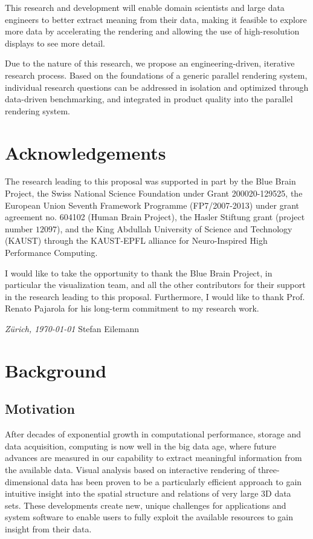 This research and development will enable domain scientists and large data
engineers to better extract meaning from their data, making it feasible to
explore more data by accelerating the rendering and allowing the use of
high-resolution displays to see more detail.

Due to the nature of this research, we propose an engineering-driven, iterative
research process. Based on the foundations of a generic parallel rendering
system, individual research questions can be addressed in isolation and
optimized through data-driven benchmarking, and integrated in product quality
into the parallel rendering system.

\vfill

\section*{Acknowledgements}

The research leading to this proposal was supported in part by the Blue Brain
Project, the Swiss National Science Foundation under Grant 200020-129525, the
European Union Seventh Framework Programme (FP7/2007-2013) under grant agreement
no. 604102 (Human Brain Project), the Hasler Stiftung grant (project number
$12097$), and the King Abdullah University of Science and Technology (KAUST)
through the KAUST-EPFL alliance for Neuro-Inspired High Performance Computing.

I would like to take the opportunity to thank the Blue Brain Project, in
particular the visualization team, and all the other contributors for their
support in the research leading to this proposal. Furthermore, I would like to
thank Prof. Renato Pajarola for his long-term commitment to my research work.

\bigskip
\noindent\textit{Z\"urich, \today}
\hfill Stefan Eilemann
\clearpage

\tableofcontents
\listoffigures

\setlength{\parskip}{1em}

\section{Background}
\subsection{Motivation} %

After decades of exponential growth in computational performance, storage and
data acquisition, computing is now well in the big data age, where future
advances are measured in our capability to extract meaningful information from
the available data. Visual analysis based on interactive rendering of
three-dimensional data has been proven to be a particularly efficient approach
to gain intuitive insight into the spatial structure and relations of very large
3D data sets. These developments create new, unique challenges for applications
and system software to enable users to fully exploit the available resources to
gain insight from their data.

